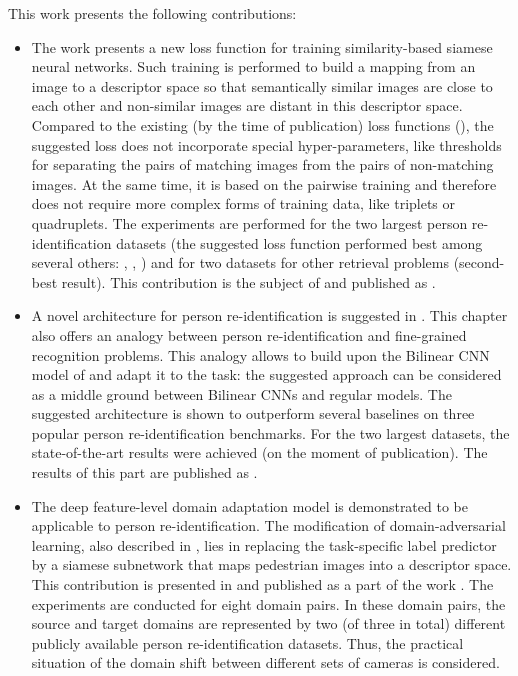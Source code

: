 This work presents the following contributions:
\begin{itemize}

    \item
    The work presents a new loss function for training similarity-based siamese neural networks. Such training is performed to build a mapping from an image to a descriptor space so that semantically similar images are close to each other and non-similar images are distant in this descriptor space. Compared to the existing (by the time of publication) loss functions (), the suggested loss does not incorporate special hyper-parameters, like thresholds for separating the pairs of matching images from the pairs of non-matching images. At the same time, it is based on the pairwise training and therefore does not require more complex forms of training data, like triplets or quadruplets. The experiments are performed for the two largest person re-identification datasets (the suggested loss function performed best among several others: , , ) and for two datasets for other retrieval problems (second-best result). This contribution is the subject of  and published as \citep{UstinovaNIPS16}. 

    \item
    A novel architecture for person re-identification is suggested in . This chapter also offers an analogy between person re-identification and fine-grained recognition problems. This analogy allows to build upon the Bilinear CNN model of \citep{lin2015bilinear} and adapt it to the task: the suggested approach can be considered as a middle ground between Bilinear CNNs and regular models. The suggested architecture is shown to outperform several baselines on three popular person re-identification benchmarks. For the two largest datasets, the state-of-the-art results were achieved (on the moment of publication). The results of this part are published as \citep{ustinova2017multi}.
 
    \item
    The deep feature-level domain adaptation model \citep{ganin2016domain} is demonstrated to be applicable to person re-identification. The modification of domain-adversarial learning, also described in , lies in replacing the task-specific label predictor by a siamese subnetwork that maps pedestrian images into a descriptor space. This contribution is presented in  and published as a part of the work \citep{ganin2016domain}. The experiments are conducted for eight domain pairs. In these domain pairs, the source and target domains are represented by two (of three in total) different publicly available person re-identification datasets. Thus, the practical situation of the domain shift between different sets of cameras is considered.


\end{itemize}

